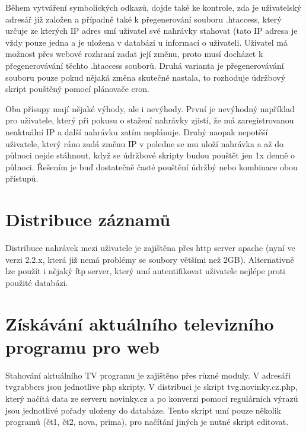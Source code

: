 \vspace{10pt}

Během vytváření symbolických odkazů, dojde také ke kontrole, zda je uživatelský adresář již založen a případně také k přegenerování souboru .htaccess, který určuje ze kterých IP adres smí uživatel své nahrávky stahovat (tato IP adresa je vždy pouze jedna a je uložena v databázi u informací o uživateli. Uživatel má možnost přes webové rozhraní zadat její změnu, proto musí docházet k přegenerovávání těchto .htaccess souborů. Druhá varianta je přegenerovávání souboru pouze pokud nějaká změna skutečně nastala, to rozhoduje údržbový skript pouštěný pomocí plánovače cron. 

Oba přísupy mají nějaké výhody, ale i nevýhody. První je nevýhodný například pro uživatele, který při pokusu o stažení nahrávky zjistí, že má zaregistrovanou neaktuální IP a další nahrávku zatím neplánuje. Druhý naopak nepotěší uživatele, který ráno zadá změnu IP v poledne se mu uloží nahrávka a až do půlnoci nejde stáhnout, když se údržbové skripty budou pouštět jen 1x denně o půlnoci. Řešením je buď dostatečně časté pouštění údržbý nebo kombinace obou přístupů.

\vspace{10pt}

\section{Distribuce záznamů}

Distribuce nahrávek mezi uživatele je zajištěna přes http server apache (nyní ve verzi 2.2.x, která již nemá problémy se soubory většími než 2GB). Alternativně lze použít i nějaký ftp server, který umí autentifikovat uživatele nejlépe proti použité databázi.

\vspace{10pt}

\section{Získávání aktuálního televizního programu pro web}

Stahování aktuálního TV programu je zajištěno přes různé moduly. V adresáři tvgrabbers jsou jednotlive php skripty. V distribuci je skript tvg.novinky.cz.php, který načítá data ze serveru novinky.cz a po konverzi pomocí regulárních výrazů jsou jednotlivé pořady uloženy do databáze. Tento skript umí pouze několik programů (čt1, čt2, nova, prima), pro načítání jiných je nutné skript editovat.


